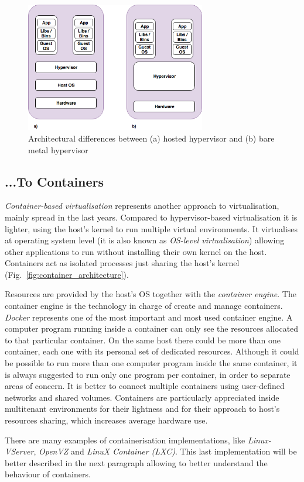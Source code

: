 \documentclass[a4paper,12pt]{article}
\def\myfig#1{Fig.~#1\xspace}
\begin{document}
\begin{figure}[ht!]
  \centerline{\includegraphics[width=0.7\textwidth]{difference_bare_metal_hosted_hypervisor.png}}
  \caption{Architectural differences between (a) hosted hypervisor and (b) bare metal hypervisor}
  \label{fig:hypervisor_difference}
  \end{figure}


\subsection{...To Containers}

\textit{Container-based virtualisation} represents another approach to
virtualisation, mainly spread in the last years. Compared to hypervisor-based
virtualisation it is lighter, using the host's kernel to run multiple virtual
environments. It virtualises at operating system level (it is also known as
\textit{OS-level virtualisation}) allowing other applications to run without
installing their own kernel on the host. Containers act as isolated processes
just sharing the host's kernel (\myfig{\ref{fig:container_architecture}}). \par
Resources are provided by the host's OS together with the \textit{container
engine}. The container engine is the technology in charge of create and manage
containers. \textit{Docker} represents one of the most important and most used
container engine. A computer program running inside a container can only see the
resources allocated to that particular container. On the same host there could
be more than one container, each one with its personal set of dedicated
resources. Although it could be possible to run more than one computer program
inside the same container, it is always suggested to run only one program per
container, in order to separate areas of concern. It is better to connect
multiple containers using user-defined networks and shared volumes. Containers
are particularly appreciated inside multitenant environments for their lightness
and for their approach to host's resources sharing, which increases average
hardware use.\par There are many examples of containerisation implementations,
like \textit{Linux-VServer}, \textit{OpenVZ} and \textit{LinuX Container (LXC)}.
This last implementation will be better described in the next paragraph allowing
to better understand the behaviour of containers. 
\end{document}
